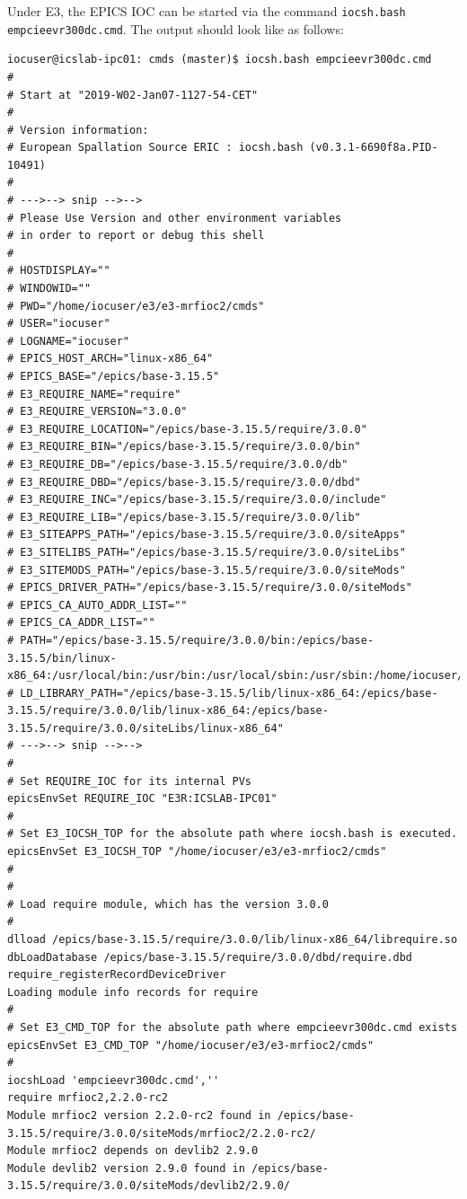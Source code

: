 \documentclass[11pt
  , a4paper
  , article
  , oneside
  , showtrims
]{memoir}
\begin{document}
{Under E3, the EPICS IOC can be started via the command \texttt{iocsh.bash empcieevr300dc.cmd}. The output should look like as follows:
\begin{lstlisting}[style=termstyle]
iocuser@icslab-ipc01: cmds (master)$ iocsh.bash empcieevr300dc.cmd
#
# Start at "2019-W02-Jan07-1127-54-CET"
#
# Version information:
# European Spallation Source ERIC : iocsh.bash (v0.3.1-6690f8a.PID-10491)
#
# --->--> snip -->-->
# Please Use Version and other environment variables
# in order to report or debug this shell
#
# HOSTDISPLAY=""
# WINDOWID=""
# PWD="/home/iocuser/e3/e3-mrfioc2/cmds"
# USER="iocuser"
# LOGNAME="iocuser"
# EPICS_HOST_ARCH="linux-x86_64"
# EPICS_BASE="/epics/base-3.15.5"
# E3_REQUIRE_NAME="require"
# E3_REQUIRE_VERSION="3.0.0"
# E3_REQUIRE_LOCATION="/epics/base-3.15.5/require/3.0.0"
# E3_REQUIRE_BIN="/epics/base-3.15.5/require/3.0.0/bin"
# E3_REQUIRE_DB="/epics/base-3.15.5/require/3.0.0/db"
# E3_REQUIRE_DBD="/epics/base-3.15.5/require/3.0.0/dbd"
# E3_REQUIRE_INC="/epics/base-3.15.5/require/3.0.0/include"
# E3_REQUIRE_LIB="/epics/base-3.15.5/require/3.0.0/lib"
# E3_SITEAPPS_PATH="/epics/base-3.15.5/require/3.0.0/siteApps"
# E3_SITELIBS_PATH="/epics/base-3.15.5/require/3.0.0/siteLibs"
# E3_SITEMODS_PATH="/epics/base-3.15.5/require/3.0.0/siteMods"
# EPICS_DRIVER_PATH="/epics/base-3.15.5/require/3.0.0/siteMods"
# EPICS_CA_AUTO_ADDR_LIST=""
# EPICS_CA_ADDR_LIST=""
# PATH="/epics/base-3.15.5/require/3.0.0/bin:/epics/base-3.15.5/bin/linux-x86_64:/usr/local/bin:/usr/bin:/usr/local/sbin:/usr/sbin:/home/iocuser/.local/bin:/home/iocuser/bin"
# LD_LIBRARY_PATH="/epics/base-3.15.5/lib/linux-x86_64:/epics/base-3.15.5/require/3.0.0/lib/linux-x86_64:/epics/base-3.15.5/require/3.0.0/siteLibs/linux-x86_64"
# --->--> snip -->-->
#
# Set REQUIRE_IOC for its internal PVs
epicsEnvSet REQUIRE_IOC "E3R:ICSLAB-IPC01"
#
# Set E3_IOCSH_TOP for the absolute path where iocsh.bash is executed.
epicsEnvSet E3_IOCSH_TOP "/home/iocuser/e3/e3-mrfioc2/cmds"
#
#
# Load require module, which has the version 3.0.0
#
dlload /epics/base-3.15.5/require/3.0.0/lib/linux-x86_64/librequire.so
dbLoadDatabase /epics/base-3.15.5/require/3.0.0/dbd/require.dbd
require_registerRecordDeviceDriver
Loading module info records for require
#
# Set E3_CMD_TOP for the absolute path where empcieevr300dc.cmd exists
epicsEnvSet E3_CMD_TOP "/home/iocuser/e3/e3-mrfioc2/cmds"
#
iocshLoad 'empcieevr300dc.cmd',''
require mrfioc2,2.2.0-rc2
Module mrfioc2 version 2.2.0-rc2 found in /epics/base-3.15.5/require/3.0.0/siteMods/mrfioc2/2.2.0-rc2/
Module mrfioc2 depends on devlib2 2.9.0
Module devlib2 version 2.9.0 found in /epics/base-3.15.5/require/3.0.0/siteMods/devlib2/2.9.0/

\end{lstlisting}}
\end{document}
